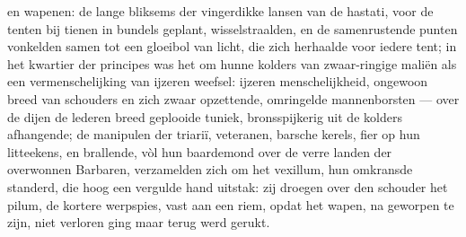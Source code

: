 \documentclass[a4paper, 12pt, oneside, dutch]{article}
\begin{document}
en wapenen: de lange bliksems der vingerdikke lansen van de hastati, voor de tenten bij tienen in bundels geplant, wisselstraalden, en de samenrustende punten vonkelden samen tot een gloeibol van licht, die zich herhaalde voor iedere tent; in het kwartier der principes was het om hunne kolders van zwaar-ringige maliën als een vermenschelijking van ijzeren weefsel: ijzeren menschelijkheid, ongewoon breed van schouders en zich zwaar opzettende, omringelde mannenborsten --- over de dijen de lederen breed geplooide tuniek, bronsspijkerig uit de kolders afhangende; de manipulen der triariï, veteranen, barsche kerels, fier op hun litteekens, en brallende, vòl hun baardemond over de verre landen der overwonnen Barbaren, verzamelden zich om het vexillum, hun omkransde standerd, die hoog een vergulde hand uitstak: zij droegen over den schouder het pilum, de kortere werpspies, vast aan een riem, opdat het wapen, na geworpen te zijn, niet verloren ging maar terug werd gerukt.
\end{document}

